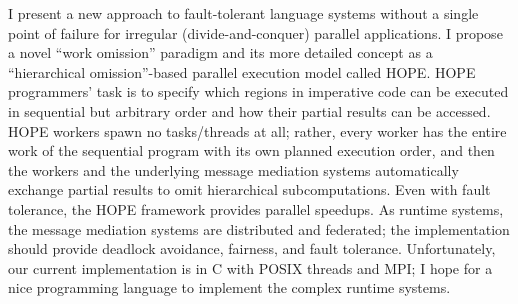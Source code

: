 I present a new approach to fault-tolerant language systems without a single point of failure for irregular (divide-and-conquer) parallel applications.  I propose a novel ``work omission'' paradigm and its more detailed concept as a ``hierarchical omission''-based parallel execution model called HOPE.
HOPE programmers' task is to specify which regions in imperative code can be executed in sequential but arbitrary order and how their partial results can be accessed.  HOPE workers spawn no tasks/threads at all; rather, every worker has the entire work of the sequential program with its own planned execution order, and then the workers and the underlying message mediation systems automatically exchange partial results to omit hierarchical subcomputations.  Even with fault tolerance, the HOPE framework provides parallel speedups.
As runtime systems, the message mediation systems are distributed and federated; the implementation should provide deadlock avoidance, fairness, and fault tolerance.  Unfortunately, our current implementation is in C with POSIX threads and MPI; I hope for a nice programming language to implement the complex runtime systems.
